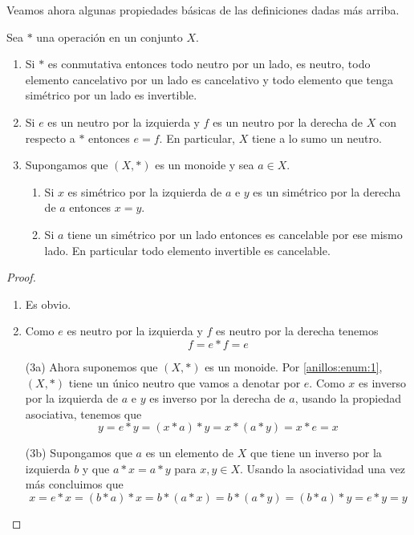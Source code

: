 Veamos ahora algunas propiedades básicas de las definiciones dadas más arriba.

\begin{prop}\label{anillos:prop:1}
    Sea $*$ una operación en un conjunto $X$.
    \begin{enumerate}[label=(\arabic*)]
        \item Si $*$ es conmutativa entonces todo neutro por un lado, es neutro, todo elemento cancelativo por un lado es cancelativo y todo elemento que tenga simétrico por un lado es invertible.
        \item\label{anillos:enum:1} Si $e$ es un neutro por la izquierda y $f$ es un neutro por la derecha de $X$ con respecto a $*$ entonces $e=f$. En particular, $X$ tiene a lo sumo un neutro.
        \item Supongamos que $(X, *)$ es un monoide y sea $a\in X$.
        \begin{enumerate}[label=(\alph*)]
            \item Si $x$ es simétrico por la izquierda de $a$ e $y$ es un simétrico por la derecha de $a$ entonces $x=y$.
            \item Si $a$ tiene un simétrico por un lado entonces es cancelable por ese mismo lado. En particular todo elemento invertible es cancelable.
        \end{enumerate}
    \end{enumerate}
\end{prop}

\begin{proof} \
    \begin{enumerate}[label=(\arabic*)]
        \item Es obvio.
        \item Como $e$ es neutro por la izquierda y $f$ es neutro por la derecha tenemos
        $$f=e*f=e$$
        \item[(3a)] Ahora suponemos que $(X,*)$ es un monoide. Por \ref{anillos:enum:1}, $(X,*)$ tiene un único neutro que vamos a denotar por $e$. Como $x$ es inverso por la izquierda de $a$ e $y$ es inverso por la derecha de $a$, usando la propiedad asociativa, tenemos que
        $$y=e*y=(x*a)*y=x*(a*y)=x*e=x$$
        \item[(3b)] Supongamos que $a$ es un elemento de $X$ que tiene un inverso por la izquierda $b$ y que $a*x=a*y$ para $x,y\in X$. Usando la asociatividad una vez más concluimos que
        $$x=e*x=(b*a)*x=b*(a*x)=b*(a*y)=(b*a)*y=e*y=y$$        
    \end{enumerate}
\end{proof}

